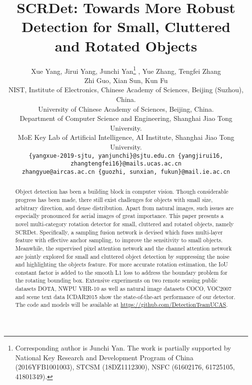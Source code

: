 \documentclass[10pt,twocolumn,letterpaper]{article}
\begin{document}
	
\title{SCRDet: Towards More Robust Detection for Small, Cluttered \\ and Rotated Objects}
	
	\author{Xue Yang, Jirui Yang, Junchi Yan\thanks{Corresponding author is Junchi Yan. The work is partially supported by National Key Research and Development Program of China (2016YFB1001003), STCSM (18DZ1112300), NSFC (61602176, 61725105, 41801349).} , Yue Zhang, Tengfei Zhang \\ Zhi Guo, Xian Sun, Kun Fu\\
		NIST, Institute of Electronics, Chinese Academy of Sciences, Beijing (Suzhou), China.\\
		University of Chinese Academy of Sciences, Beijing, China.\\
		Department of Computer Science and Engineering, Shanghai Jiao Tong University.\\
		MoE Key Lab of Artificial Intelligence, AI Institute, Shanghai Jiao Tong University. \\
		{\tt\small \{yangxue-2019-sjtu, yanjunchi\}@sjtu.edu.cn \quad \{yangjirui16, zhangtengfei16\}@mails.ucas.ac.cn} \\
		{\tt\small \quad zhangyue@aircas.ac.cn \quad \{guozhi, sunxian, fukun\}@mail.ie.ac.cn}
	}
	
	\maketitle
\ificcvfinal\thispagestyle{empty}\fi
	
\begin{abstract}
		Object detection has been a building block in computer vision. Though considerable progress has been made, there still exist challenges for objects with small size, arbitrary direction, and dense distribution. Apart from natural images, such issues are especially pronounced for aerial images of great importance. This paper presents a novel multi-category rotation detector for small, cluttered and rotated objects, namely SCRDet. Specifically, a sampling fusion network is devised which fuses multi-layer feature with effective anchor sampling, to improve the sensitivity to small objects. Meanwhile, the supervised pixel attention network and the channel attention network are jointly explored for small and cluttered object detection by suppressing the noise and highlighting the objects feature. For more accurate rotation estimation, the IoU constant factor is added to the smooth L1 loss to address the boundary problem for the rotating bounding box. Extensive experiments on two remote sensing public datasets DOTA, NWPU VHR-10 as well as natural image datasets COCO, VOC2007 and scene text data ICDAR2015 show the state-of-the-art performance of our detector. The code and models will be available at \url{https://github.com/DetectionTeamUCAS}.\end{abstract}
	
\end{document}
